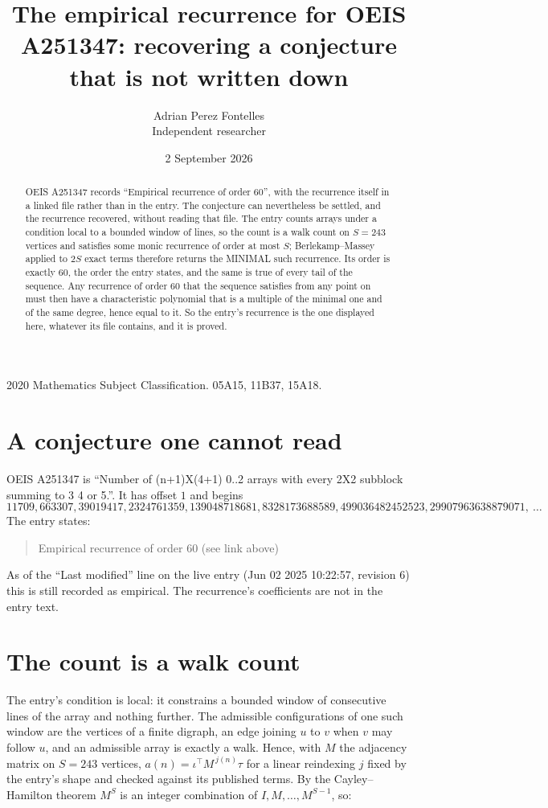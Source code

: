 \documentclass[11pt,a4paper]{article}
\title{The empirical recurrence for OEIS A251347: recovering a conjecture that is not written down}
\author{Adrian Perez Fontelles\\ \small Independent researcher}
\date{2 September 2026}
\theoremstyle{plain}
\theoremstyle{definition}
\begin{document}
\maketitle

\begin{abstract}
OEIS A251347 records ``Empirical recurrence of order $60$'', with the recurrence itself in a
linked file rather than in the entry. The conjecture can nevertheless be settled, and the
recurrence recovered, without reading that file. The entry counts arrays under a condition
local to a bounded window of lines, so the count is a walk count on $S=243$ vertices and
satisfies some monic recurrence of order at most $S$; Berlekamp--Massey applied to $2S$ exact
terms therefore returns the MINIMAL such recurrence. Its order is exactly $60$, the order
the entry states, and the same is true of every tail of the sequence. Any recurrence of order
$60$ that the sequence satisfies from any point on must then have a characteristic
polynomial that is a multiple of the minimal one and of the same degree, hence equal to it. So
the entry's recurrence is the one displayed here, whatever its file contains, and it is
proved.
\end{abstract}

\noindent\small 2020 Mathematics Subject Classification. 05A15, 11B37, 15A18.\normalsize

\section{A conjecture one cannot read}

OEIS A251347 is ``Number of (n+1)X(4+1) 0..2 arrays with every 2X2 subblock summing to 3 4 or 5.''. It has offset $1$ and begins
\[
11709, 663307, 39019417, 2324761359, 139048718681, 8328173688589, 499036482452523, 29907963638879071,\ \dots
\]
The entry states:
\begin{quote}
Empirical recurrence of order 60 (see link above)
\end{quote}
As of the ``Last modified'' line on the live entry (Jun 02 2025 10:22:57, revision 6) this is still
recorded as empirical. The recurrence's coefficients are not in the entry text.

\section{The count is a walk count}

The entry's condition is local: it constrains a bounded window of consecutive lines of the
array and nothing further. The admissible configurations of one such window are the vertices
of a finite digraph, an edge joining $u$ to $v$ when $v$ may follow $u$, and an admissible
array is exactly a walk. Hence, with $M$ the adjacency matrix on $S=243$ vertices,
$a(n)=\iota^{\!\top}M^{\,j(n)}\tau$ for a linear reindexing $j$ fixed by the entry's shape
and checked against its published terms. By the Cayley--Hamilton theorem $M^{S}$ is an
integer combination of $I,M,\dots,M^{S-1}$, so:
\end{document}
